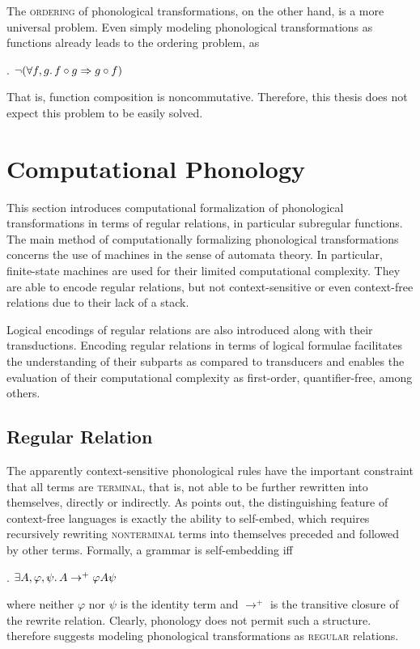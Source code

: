 \documentclass[12pt, a4paper]{report}
\newcommand{\textterm}[1]{\textsc{#1}\index{#1}}
\renewcommand{\implies}{\Rightarrow}
\begin{document}
The \textterm{ordering} of phonological transformations, on the other
hand, is a more universal problem.  Even simply modeling phonological
transformations as functions already leads to the ordering problem, as

\ex. \(\neg(\forall f, g\ldotp f \circ g \implies g \circ f)\)

That is, function composition is noncommutative.  Therefore, this
thesis does not expect this problem to be easily solved.

\section{Computational Phonology}
This section introduces computational formalization of phonological
transformations in terms of regular relations, in particular
subregular functions.  The main method of computationally formalizing
phonological transformations concerns the use of machines in the sense
of automata theory.  In particular, finite-state machines are used for
their limited computational complexity.  They are able to encode
regular relations, but not context-sensitive or even context-free
relations due to their lack of a stack.

Logical encodings of regular relations are also introduced along with
their transductions.  Encoding regular relations in terms of logical
formulae facilitates the understanding of their subparts as compared
to transducers and enables the evaluation of their computational
complexity as first-order, quantifier-free, among others.

\subsection{Regular Relation}
The apparently context-sensitive phonological rules have the important
constraint that all terms are \textterm{terminal}, that is, not able
to be further rewritten into themselves, directly or indirectly.  As
\textcite{c59cfpg} points out, the distinguishing feature of
context-free languages is exactly the ability to self-embed, which
requires recursively rewriting \textterm{nonterminal} terms into
themselves preceded and followed by other terms.  Formally, a grammar
is self-embedding iff

\ex. \(\exists A, \varphi, \psi\ldotp A \to^{+} \varphi A \psi\)

where neither \(\varphi\) nor \(\psi\) is the identity term and
\(\to^{+}\) is the transitive closure of the rewrite relation.
Clearly, phonology does not permit such a structure.
\textcite{kk94rmprs} therefore suggests modeling phonological
transformations as \textterm{regular} relations.
\end{document}
